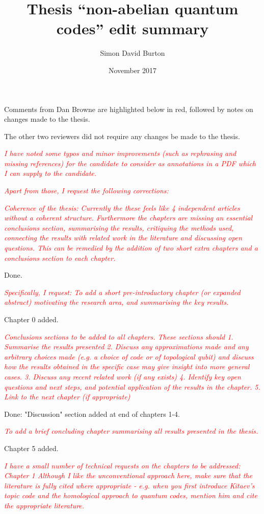 \documentclass[11pt,oneside]{article}
\title{Thesis ``non-abelian quantum codes'' edit summary}
\author{Simon David Burton}
\date{November 2017}
\newcommand{\danbrowne}[1]{\vspace{10pt}\noindent\textcolor{red}{{\it #1}}}
\begin{document}
\maketitle

Comments from Dan Browne are highlighted below in red, followed by 
notes on changes made to the thesis.

The other two reviewers did not require any changes be made to the thesis.

\danbrowne{
I have noted some typos and minor improvements (such as rephrasing and missing references) for the candidate to consider as
annotations in a PDF which I can supply to the candidate.
}


\danbrowne{
Apart from those, I request the following corrections:
}

\danbrowne{
Coherence of the thesis:
Currently the these feels like 4 independent articles without a coherent structure. Furthermore the chapters are missing an
essential conclusions section, summarising the results, critiquing the methods used, connecting the results with related work in the
literature and discussing open questions. This can be remedied by the addition of two short extra chapters and a conclusions
section to each chapter.
}

Done.

\danbrowne{
Specifically, I request:
To add a short pre-introductory chapter (or expanded abstract) motivating the research area, and summarising the key results.
}

Chapter 0 added.

\danbrowne{
Conclusions sections to be added to all chapters. These sections should
1. Summarise the results presented
2. Discuss any approximations made and any arbitrary choices made (e.g. a choice of code or of topological qubit) and
discuss how the results obtained in the specific case may give insight into more general cases.
3. Discuss any recent related work (if any exists)
4. Identify key open questions and next steps, and potential application of the results in the chapter.
5. Link to the next chapter (if appropriate)
}

Done: "Discussion" section added at end of chapters 1-4.

\danbrowne{
To add a brief concluding chapter summarising all results presented in the thesis.
}

Chapter 5 added.

\danbrowne{
I have a small number of technical requests on the chapters to be addressed:
Chapter 1
Although I like the unconventional approach here, make sure that the literature is fully cited where appropriate - e.g. when you first
introduce Kitaev’s topic code and the homological approach to quantum codes, mention him and cite the appropriate literature.
}
\end{document}

